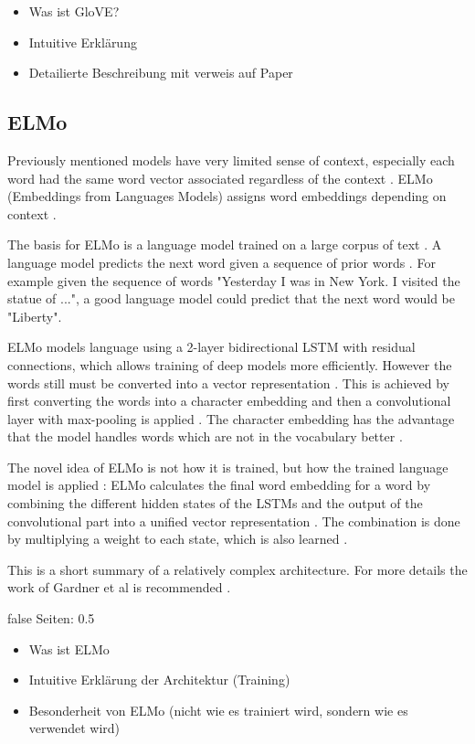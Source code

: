 \documentclass[draft,final,oneside]{vutinfth} %
\begin{document}
\begin{itemize}
\item Was ist GloVE?
\item Intuitive Erklärung
\item Detailierte Beschreibung mit verweis auf Paper
\end{itemize}

\fi

\subsection{ELMo \cite{elmo}}
Previously mentioned models have very limited sense of context, especially each word had the same word vector associated regardless of the context \cite{pennington2014glove}\cite{tfidf}. ELMo (Embeddings from Languages Models) assigns word embeddings depending on context \cite{elmo}.

The basis for ELMo is a language model trained on a large corpus of text \cite{elmo}. A language model predicts the next word given a sequence of prior words \cite{statisticalnlp}. For example given the sequence of words "Yesterday I was in New York. I visited the statue of ...", a good language model could predict that the next word would be "Liberty".

ELMo models language using a 2-layer bidirectional LSTM with residual connections, which allows training of deep models more efficiently. However the words still must be converted into a vector representation \cite{elmo}. This is achieved by first converting the words into a character embedding and then a convolutional layer with max-pooling is applied \cite{elmo}. The character embedding has the advantage that the model handles words which are not in the vocabulary better \cite{elmo}.

The novel idea of ELMo is not how it is trained, but how the trained language model is applied \cite{elmo}: ELMo calculates the final word embedding for a word by combining the different hidden states of the LSTMs and the output of the convolutional part into a unified vector representation \cite{elmo}. The combination is done by multiplying a weight to each state, which is also learned \cite{elmo}.

This is a short summary of a relatively complex architecture. For more details the work of Gardner et al is recommended \cite{elmo}.

\if false
Seiten: 0.5

\begin{itemize}
\item Was ist ELMo
\item Intuitive Erklärung der Architektur (Training)
\item Besonderheit von ELMo (nicht wie es trainiert wird, sondern wie es verwendet wird)
\end{itemize}
\end{document}
